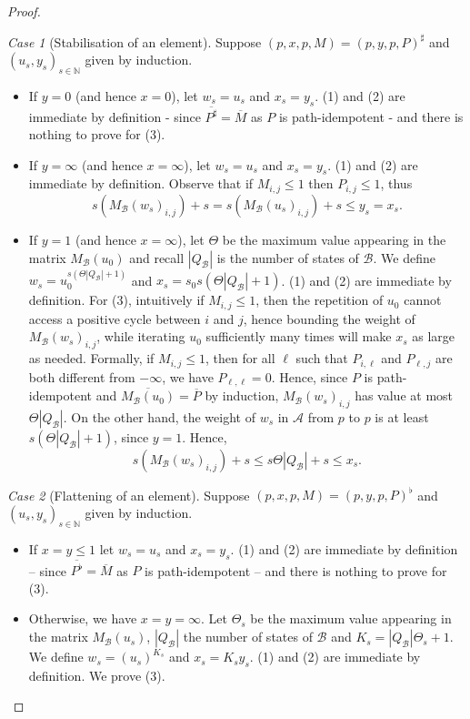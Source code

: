 \documentclass[10pt,a4paper]{amsart}
\theoremstyle{definition}
\numberwithin{equation}{section}
\theoremstyle{remark}
\newtheorem{case}{Case}
\newcommand{\N}{\mathbb{N}}
\newcommand{\autA}{\mathcal{A}}
\newcommand{\autB}{\mathcal{B}}
\theoremstyle{remark}
\begin{document}
\begin{proof}
\begin{case}[Stabilisation of an element]
Suppose $(p,x,p,M) = (p,y,p,P)^\sharp$ and $(u_s,y_s)_{s\in\N}$ given by induction. 
\begin{itemize}
\item If $y = 0$ (and hence $x=0$), let $w_s = u_s$ and $x_s=y_s$. (1) and (2) are immediate by definition - since $\overline{P^\sharp} = \overline{M}$ as $P$ is path-idempotent - and there is nothing to prove for (3). 
\item If $y=\infty$ (and hence $x=\infty$), let $w_s = u_s$ and $x_s=y_s$. (1) and (2) are immediate by definition. Observe that if $M_{i,j} \le 1$ then $P_{i,j} \le 1$, thus 
\[
s(M_\autB(w_s)_{i,j}) + s = s(M_\autB(u_s)_{i,j}) + s \le y_s = x_s.
\]
\item If $y=1$ (and hence $x=\infty$), let $\Theta$ be the maximum value appearing in the matrix $M_\autB(u_0)$ and recall $|Q_\autB|$ is the number of states of $\autB$.
We define $w_s = u_0^{s(\Theta|Q_\autB| + 1)}$ and $x_s = s_0s(\Theta|Q_\autB| + 1)$. (1) and (2) are immediate by definition. For (3), intuitively if $M_{i,j} \leq 1$, then the repetition of $u_0$ cannot access a positive cycle between $i$ and $j$, hence bounding the weight of $M_\autB(w_s)_{i,j}$, while iterating $u_0$ sufficiently many times will make $x_s$ as large as needed. 
Formally, if $M_{i,j} \leq 1$, then for all $\ell$ such that $P_{i,\ell}$ and $P_{\ell,j}$ are both different from $-\infty$, we have $P_{\ell,\ell} = 0$. Hence, since $P$ is path-idempotent and $\overline{M_\autB(u_0)} = \overline{P}$ by induction, $M_\autB(w_s)_{i,j}$ has value at most $\Theta|Q_\autB|$. On the other hand, the weight of $w_s$ in $\autA$ from $p$ to $p$ is at least $s(\Theta|Q_\autB| + 1)$, since $y=1$. Hence,
\[
s(M_\autB(w_s)_{i,j}) + s \le s\Theta|Q_\autB| + s \le x_s.
\]

\end{itemize}
\end{case}
\begin{case}[Flattening of an element]

Suppose $(p,x,p,M) = (p,y,p,P)^\flat$ and $(u_s,y_s)_{s\in\N}$ given by induction. 
\begin{itemize}
\item If $x=y\le 1$ let $w_s = u_s$ and $x_s=y_s$. (1) and (2) are immediate by definition -- since $\overline{P^\flat} = \overline{M}$ as $P$ is path-idempotent -- and there is nothing to prove for (3). 

\item Otherwise, we have $x= y=\infty$. 
Let $\Theta_s$ be the maximum value appearing in the matrix $M_\autB(u_s)$, $|Q_\autB|$ the number of states of $\autB$ and $K_s = |Q_\autB|\Theta_s + 1$. We define $w_s = (u_s)^{K_s}$ and $x_s = K_s y_s$.
(1) and (2) are immediate by definition. We prove (3).


\end{itemize}
\end{case}
\end{proof}
\end{document}
